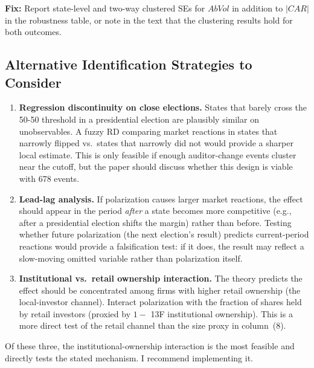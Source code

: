 \documentclass[11pt]{article}
\begin{document}
\begin{minorbox}
\textbf{Fix:} Report state-level and two-way clustered SEs for $AbVol$ in addition to $|CAR|$ in the robustness table, or note in the text that the clustering results hold for both outcomes.
\end{minorbox}

\subsection{Alternative Identification Strategies to Consider}

\begin{enumerate}[leftmargin=*]
    \item \textbf{Regression discontinuity on close elections.} States that barely cross the 50-50 threshold in a presidential election are plausibly similar on unobservables. A fuzzy RD comparing market reactions in states that narrowly flipped vs.\ states that narrowly did not would provide a sharper local estimate. This is only feasible if enough auditor-change events cluster near the cutoff, but the paper should discuss whether this design is viable with 678 events.

    \item \textbf{Lead-lag analysis.} If polarization causes larger market reactions, the effect should appear in the period \emph{after} a state becomes more competitive (e.g., after a presidential election shifts the margin) rather than before. Testing whether future polarization (the next election's result) predicts current-period reactions would provide a falsification test: if it does, the result may reflect a slow-moving omitted variable rather than polarization itself.

    \item \textbf{Institutional vs.\ retail ownership interaction.} The theory predicts the effect should be concentrated among firms with higher retail ownership (the local-investor channel). Interact polarization with the fraction of shares held by retail investors (proxied by $1 -$ 13F institutional ownership). This is a more direct test of the retail channel than the size proxy in column~(8).
\end{enumerate}

\begin{majorbox}
Of these three, the institutional-ownership interaction is the most feasible and directly tests the stated mechanism. I recommend implementing it.
\end{majorbox}
\end{document}
